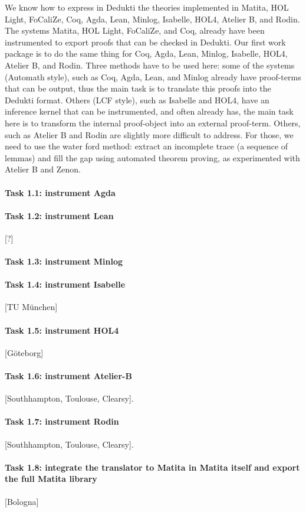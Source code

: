 We know how to express in Dedukti the theories implemented in Matita,
HOL Light, FoCaliZe, Coq, Agda, Lean, Minlog, Isabelle, HOL4,
Atelier B, and Rodin. The systems Matita, HOL Light, FoCaliZe, and
Coq, already have been instrumented to export proofs that can be
checked in Dedukti. Our first work package is to do the same thing for
Coq, Agda, Lean, Minlog, Isabelle, HOL4, Atelier B, and
Rodin. Three methods have to be used here: some of the systems
(Automath style), such as Coq, Agda, Lean, and Minlog already have
proof-terms that can be output, thus the main task is to translate
this proofs into the Dedukti format. Others (LCF style), such as
Isabelle and HOL4, have an inference kernel that can be
instrumented, and often already has, the main task here is to transform
the internal proof-object into an external proof-term. Others, such as
Atelier B and Rodin are slightly more difficult to address. For those,
we need to use the water ford method: extract an incomplete trace (a
sequence of lemmas) and fill the gap using automated theorem proving,
as experimented with Atelier B and Zenon.


\paragraph{Task 1.1: instrument Agda}



\paragraph{Task 1.2: instrument Lean}

[?]

\paragraph{Task 1.3: instrument Minlog}



\paragraph{Task 1.4: instrument Isabelle}

[TU München]

\paragraph{Task 1.5: instrument HOL4}

[G\"oteborg]

\paragraph{Task 1.6: instrument Atelier-B}

[Southhampton, Toulouse, Clearsy].

\paragraph{Task 1.7: instrument Rodin}

[Southhampton, Toulouse, Clearsy].

\paragraph{Task 1.8: integrate the translator to Matita in Matita itself and export the full Matita library}

[Bologna]

